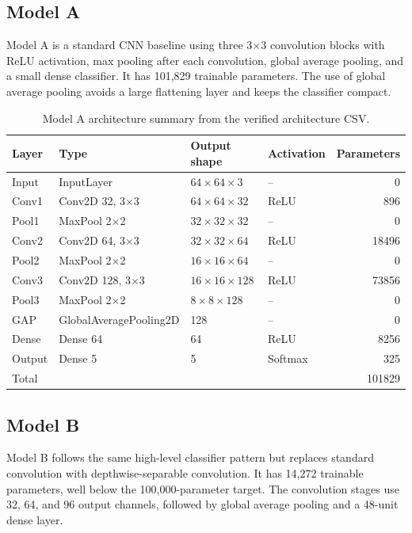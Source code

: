 \documentclass[11pt,a4paper]{article}
\begin{document}
\subsection{Model A}
Model A is a standard CNN baseline using three 3$\times$3 convolution blocks with ReLU activation, max pooling after each convolution, global average pooling, and a small dense classifier. It has 101,829 trainable parameters. The use of global average pooling avoids a large flattening layer and keeps the classifier compact.

\begin{table}[H]
\centering
\caption{Model A architecture summary from the verified architecture CSV.}
\label{tab:model_a_arch}
\begin{tabular}{llllr}
\toprule
Layer & Type & Output shape & Activation & Parameters \\
\midrule
Input & InputLayer & $64\times64\times3$ & -- & 0 \\
Conv1 & Conv2D 32, 3$\times$3 & $64\times64\times32$ & ReLU & 896 \\
Pool1 & MaxPool 2$\times$2 & $32\times32\times32$ & -- & 0 \\
Conv2 & Conv2D 64, 3$\times$3 & $32\times32\times64$ & ReLU & 18496 \\
Pool2 & MaxPool 2$\times$2 & $16\times16\times64$ & -- & 0 \\
Conv3 & Conv2D 128, 3$\times$3 & $16\times16\times128$ & ReLU & 73856 \\
Pool3 & MaxPool 2$\times$2 & $8\times8\times128$ & -- & 0 \\
GAP & GlobalAveragePooling2D & 128 & -- & 0 \\
Dense & Dense 64 & 64 & ReLU & 8256 \\
Output & Dense 5 & 5 & Softmax & 325 \\
\midrule
Total & & & & 101829 \\
\bottomrule
\end{tabular}
\end{table}

\subsection{Model B}
Model B follows the same high-level classifier pattern but replaces standard convolution with depthwise-separable convolution. It has 14,272 trainable parameters, well below the 100,000-parameter target. The convolution stages use 32, 64, and 96 output channels, followed by global average pooling and a 48-unit dense layer.
\end{document}
